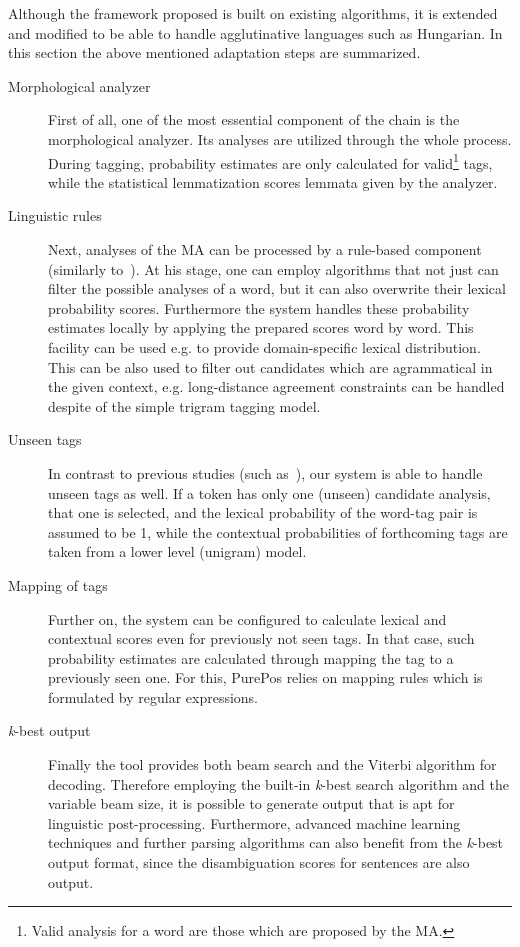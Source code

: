 Although the framework proposed is built on existing algorithms, it is extended and modified  to be able to handle agglutinative languages such as Hungarian.
In this section the above mentioned adaptation steps are summarized. 
\begin{description}
  \item[Morphological analyzer] First of all, one of the most essential component of the chain is the morphological analyzer.
Its analyses are utilized through the whole process.
During tagging, probability estimates are only calculated for valid\footnote{ Valid analysis for a word are those which are proposed by the MA.} tags, while the statistical lemmatization scores lemmata given by the analyzer.
  \item[Linguistic rules] Next, analyses of the MA can be processed by a rule-based component (similarly to~\cite{}).
At his stage, one can employ algorithms that not just can filter the possible analyses of a word, but it can also overwrite their lexical probability scores.
Furthermore the system handles these probability estimates locally by applying the prepared scores word by word.
This facility can be used e.g. to provide domain-specific lexical distribution.
This can be also used to filter out candidates which are agrammatical in the given context, e.g. long-distance agreement constraints can be handled despite of the simple trigram tagging model.
  \item[Unseen tags] In contrast to previous studies (such as~\cite{}), our system is able to handle unseen tags as well.
If a token has only one (unseen) candidate analysis, that one is selected, and the lexical probability of the word-tag pair is assumed to be 1, while the contextual probabilities of forthcoming tags are taken from a lower level (unigram) model.
  \item[Mapping of tags] Further on, the system can be configured to calculate lexical and contextual scores even for previously not seen tags.
In that case, such probability estimates are calculated through mapping the tag to a previously seen one.
For this, PurePos relies on mapping rules which is formulated by regular expressions.
  \item[\emph{k}-best output] Finally the tool provides both beam search and the Viterbi algorithm for decoding.
Therefore employing the built-in \emph{\emph{k}}-best search algorithm and the variable beam size, it is possible to generate output that is apt for linguistic post-processing.
Furthermore, advanced machine learning techniques and further parsing algorithms can also benefit from the \emph{\emph{k}}-best output format, since the disambiguation scores for sentences are also output.
\end{description}

